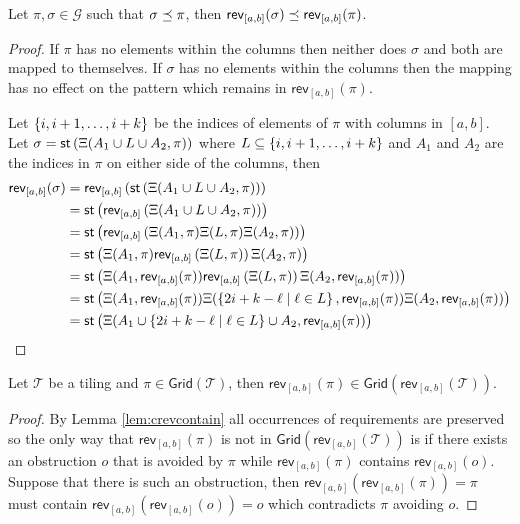 \begin{lemma}\label{lem:crevcontain}
Let $\pi, \sigma \in \mathcal{G}$ such that $\sigma \preceq \pi$, then $\textsf{rev}_{[a,b]}(\sigma) \preceq \textsf{rev}_{[a,b]}(\pi)$.
\end{lemma}
\begin{proof}
If $\pi$ has no elements within the columns then neither does $\sigma$ and both are mapped to themselves. If $\sigma$ has no elements within the columns then the mapping has no effect on the pattern which remains in $\textsf{rev}_{[a,b]}(\pi)$. 

Let $\left\{i,i+1,\dotsc,i+k\right\}$ be the indices of elements of $\pi$ with columns in $[a,b]$. Let $\sigma = \textsf{st}\left(\Xi(A_1\cup L \cup A_2,\pi)\right)$ where $L \subseteq \left\{i,i+1,\dotsc,i+k\right\}$ and $A_1$ and $A_2$ are the indices in $\pi$ on either side of the columns, then
\begin{align*}
    \textsf{rev}_{[a,b]}(\sigma) &= \textsf{rev}_{[a,b]}\left(\textsf{st}\left(\Xi(A_1\cup L \cup A_2,\pi)\right)\right)\\ 
    &= \textsf{st}\left(\textsf{rev}_{[a,b]}\left(\Xi(A_1\cup L \cup A_2,\pi)\right)\right)\\
    &= \textsf{st}\left(\textsf{rev}_{[a,b]}\left(\Xi(A_1,\pi)\Xi(L,\pi)\Xi(A_2,\pi)\right)\right)\\
    &= \textsf{st}\left(\Xi(A_1,\pi)\textsf{rev}_{[a,b]}\left(\Xi(L,\pi)\right)\Xi(A_2,\pi)\right) \\
    &= \textsf{st}\left(\Xi(A_1,\textsf{rev}_{[a,b]}(\pi))\textsf{rev}_{[a,b]}\left(\Xi(L,\pi)\right)\Xi(A_2,\textsf{rev}_{[a,b]}(\pi))\right) \\
    &= \textsf{st}\left(\Xi(A_1,\textsf{rev}_{[a,b]}(\pi))\Xi(\left\{2i+k-\ell \mid \ell \in L\right\},\textsf{rev}_{[a,b]}(\pi))\Xi(A_2,\textsf{rev}_{[a,b]}(\pi))\right)\\
    &= \textsf{st}\left(\Xi(A_1 \cup \left\{2i+k-\ell \mid \ell \in L\right\} \cup A_2,\textsf{rev}_{[a,b]}(\pi))\right)
\end{align*}
\end{proof}

\begin{lemma}\label{lem:crevgrid}
Let $\mathcal{T}$ be a tiling and $\pi \in \textsf{Grid}(\mathcal{T})$, then $\textsf{rev}_{[a,b]}(\pi)\in\textsf{Grid}(\textsf{rev}_{[a,b]}(\mathcal{T}))$.
\end{lemma}
\begin{proof}
By Lemma \ref{lem:crevcontain} all occurrences of requirements are preserved so the only way that $\textsf{rev}_{[a,b]}(\pi)$ is not in $\textsf{Grid}(\textsf{rev}_{[a,b]}(\mathcal{T}))$ is if there exists an obstruction $o$ that is avoided by $\pi$ while $\textsf{rev}_{[a,b]}(\pi)$ contains $\textsf{rev}_{[a,b]}(o)$. Suppose that there is such an obstruction, then $\textsf{rev}_{[a,b]}(\textsf{rev}_{[a,b]}(\pi)) = \pi$ must contain $\textsf{rev}_{[a,b]}(\textsf{rev}_{[a,b]}(o)) = o$ which contradicts $\pi$ avoiding $o$.
\end{proof}

